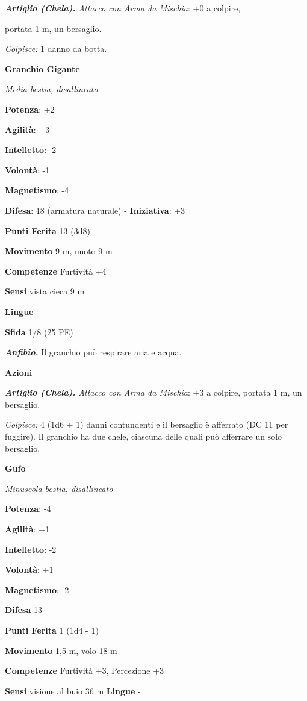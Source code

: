 \begin{multicols}{2}
\emph{\textbf{Artiglio (Chela).} Attacco con Arma da Mischia}: +0 a
colpire,

portata 1 m, un bersaglio.

\emph{Colpisce:} 1 danno da botta.

\textbf{Granchio Gigante}

\emph{Media bestia, disallineato}

\textbf{Potenza}: +2

\textbf{Agilità}: +3

\textbf{Intelletto}: -2

\textbf{Volontà}: -1

\textbf{Magnetismo}: -4

\textbf{Difesa}: 18 (armatura naturale) - \textbf{Iniziativa}: +3

\textbf{Punti Ferita} 13 (3d8)

\textbf{Movimento} 9 m, nuoto 9 m

\textbf{Competenze} Furtività +4

\textbf{Sensi} vista cieca 9 m

\textbf{Lingue} -

\textbf{Sfida} 1/8 (25 PE)\smallskip

\emph{\textbf{Anfibio.}} Il granchio può respirare aria e acqua.

\smallskip\textbf{Azioni}

\emph{\textbf{Artiglio (Chela).} Attacco con Arma da Mischia}: +3 a
colpire, portata 1 m, un bersaglio.

\emph{Colpisce:} 4 (1d6 + 1) danni contundenti e il bersaglio è
afferrato (DC 11 per fuggire). Il granchio ha due chele, ciascuna delle
quali può afferrare un solo bersaglio.

\textbf{Gufo}

\emph{Minuscola bestia, disallineato}

\textbf{Potenza}: -4

\textbf{Agilità}: +1

\textbf{Intelletto}: -2

\textbf{Volontà}: +1

\textbf{Magnetismo}: -2

\textbf{Difesa} 13

\textbf{Punti Ferita} 1 (1d4 - 1)

\textbf{Movimento} 1,5 m, volo 18 m

\textbf{Competenze} Furtività +3, Percezione +3

\textbf{Sensi} visione al buio 36 m
\textbf{Lingue} -


\end{multicols}
